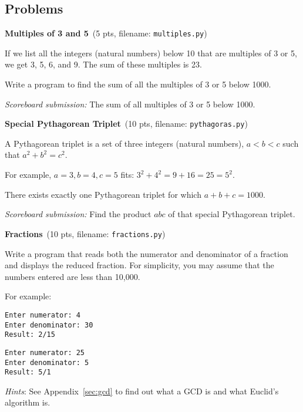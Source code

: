\documentclass[11pt]{cselabheader}
\newcommand{\cop}[3]{\textbf{#1}~(#2 pts, filename: \texttt{#3})\quad}
\theoremstyle{plain}
\begin{document}
\pagebreak
\subsection{Problems}

\begin{enumerate}
	\item \cop{Multiples of 3 and 5}{5}{multiples.py}

		If we list all the integers (natural numbers) below 10 that are
		multiples of 3 or 5, we get 3, 5, 6, and 9. The sum of these multiples
		is 23.

		Write a program to find the sum of all the multiples of 3 or 5 below
		1000.

		\textit{Scoreboard submission:} The sum of all multiples of 3 or 5
		below 1000.

	\item \cop{Special Pythagorean Triplet}{10}{pythagoras.py}

		A Pythagorean triplet is a set of three integers (natural numbers), $a
		< b < c$ such that $a^2 + b^2 = c^2$.

		For example, $a = 3, b = 4, c = 5$ fits: $3^2 + 4^2 = 9 + 16 = 25 =
		5^2$.

		There exists exactly one Pythagorean triplet for which $a + b + c =
		1000$.

		\textit{Scoreboard submission:} Find the product $abc$ of that special
		Pythagorean triplet.

	\item \cop{Fractions}{10}{fractions.py}
		
		Write a program that reads both the numerator and denominator of
		a fraction and displays the reduced fraction. For simplicity, you
		may assume that the numbers entered are less than 10,000. 
		
		For example:
		\begin{lstlisting}[style=bash]
Enter numerator: 4
Enter denominator: 30
Result: 2/15
		\end{lstlisting}

		\begin{lstlisting}[style=bash]
Enter numerator: 25
Enter denominator: 5
Result: 5/1
		\end{lstlisting}

		\textit{Hints}: See Appendix~\ref{sec:gcd} to find out what a GCD is 
		and what Euclid's algorithm is. 


\end{enumerate}
\end{document}
